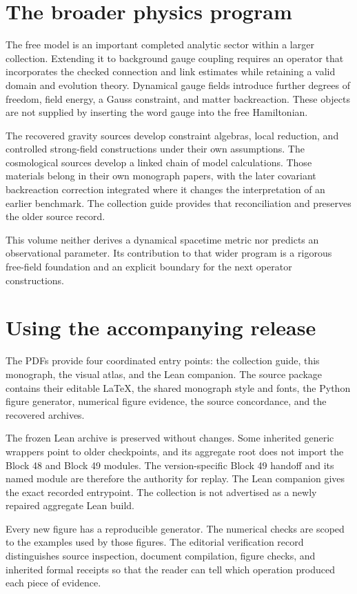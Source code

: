 \section{The broader physics program}
The free model is an important completed analytic sector within a larger collection. Extending it to background gauge coupling requires an operator that incorporates the checked connection and link estimates while retaining a valid domain and evolution theory. Dynamical gauge fields introduce further degrees of freedom, field energy, a Gauss constraint, and matter backreaction. These objects are not supplied by inserting the word gauge into the free Hamiltonian.

The recovered gravity sources develop constraint algebras, local reduction, and controlled strong-field constructions under their own assumptions. The cosmological sources develop a linked chain of model calculations. Those materials belong in their own monograph papers, with the later covariant backreaction correction integrated where it changes the interpretation of an earlier benchmark. The collection guide provides that reconciliation and preserves the older source record.

This volume neither derives a dynamical spacetime metric nor predicts an observational parameter. Its contribution to that wider program is a rigorous free-field foundation and an explicit boundary for the next operator constructions.


\section{Using the accompanying release}
The PDFs provide four coordinated entry points: the collection guide, this monograph, the visual atlas, and the Lean companion. The source package contains their editable LaTeX, the shared monograph style and fonts, the Python figure generator, numerical figure evidence, the source concordance, and the recovered archives.

The frozen Lean archive is preserved without changes. Some inherited generic wrappers point to older checkpoints, and its aggregate root does not import the Block 48 and Block 49 modules. The version-specific Block 49 handoff and its named module are therefore the authority for replay. The Lean companion gives the exact recorded entrypoint. The collection is not advertised as a newly repaired aggregate Lean build.

Every new figure has a reproducible generator. The numerical checks are scoped to the examples used by those figures. The editorial verification record distinguishes source inspection, document compilation, figure checks, and inherited formal receipts so that the reader can tell which operation produced each piece of evidence.
